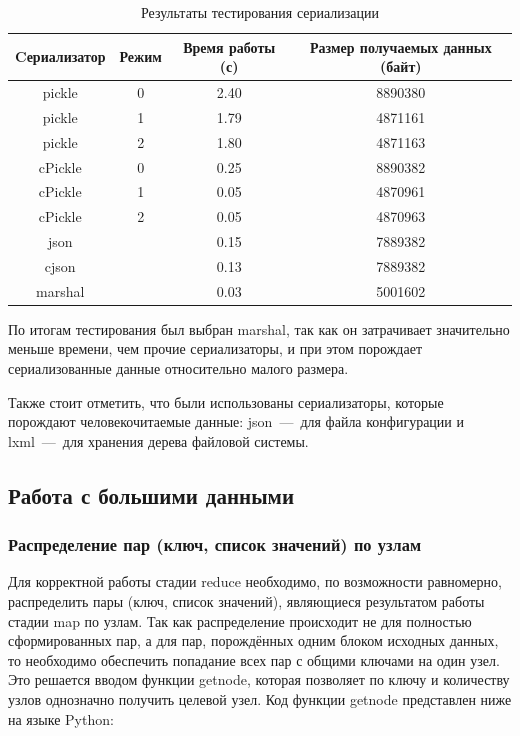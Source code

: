 \documentclass[12pt,a4paper,oneside]{extarticle}
\begin{document}
            \begin{table}[h!]
                \centering
                \begin{tabular}{|c|c|c|c|}
                    \hline
                    Cериализатор & Режим & Время работы (с)  & Размер получаемых данных (байт) \\
                    \hline
                    pickle & 0 & 2.40 & 8890380 \\
                    pickle & 1 & 1.79 & 4871161 \\
                    pickle & 2 & 1.80 & 4871163 \\
                    cPickle & 0 & 0.25 & 8890382 \\
                    cPickle & 1 & 0.05 & 4870961 \\
                    cPickle & 2 & 0.05 & 4870963 \\
                    json &  & 0.15 & 7889382 \\
                    cjson &  & 0.13 & 7889382 \\
                    marshal &  & 0.03 & 5001602 \\
                    \hline
                \end{tabular}
           
                \caption{Результаты тестирования сериализации}
                \label{table:serialize}
            \end{table}

            По итогам тестирования был выбран marshal, так как он затрачивает значительно меньше времени, чем прочие сериализаторы, и при этом порождает сериализованные данные относительно малого размера.

            Также стоит отметить, что были использованы сериализаторы, которые порождают человекочитаемые данные: json~---~для файла конфигурации и lxml~---~для хранения дерева файловой системы.

    \subsection{Работа с большими данными}
        \subsubsection{Распределение пар (ключ, список значений) по узлам}
            Для корректной работы стадии reduce необходимо, по возможности равномерно, распределить пары (ключ, список значений), являющиеся результатом работы стадии map по узлам. Так как распределение происходит не для полностью сформированных пар, а для пар, порождённых одним блоком исходных данных, то необходимо обеспечить попадание всех пар с общими ключами на один узел. Это решается вводом функции get\textunderscore node, которая позволяет по ключу и количеству узлов однозначно получить целевой узел. Код функции get\textunderscore node представлен ниже на языке Python:
\end{document}
